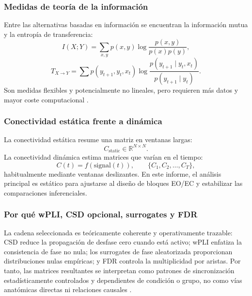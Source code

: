 \subsubsection{Medidas de teoría de la información}

Entre las alternativas basadas en información se encuentran la información mutua y la entropía de transferencia:
\[
I(X;Y)=\sum_{x,y}p(x,y)\log\frac{p(x,y)}{p(x)p(y)},
\]
\[
T_{X\to Y}=\sum p(y_{t+1},y_t,x_t)\log\frac{p(y_{t+1}\mid y_t,x_t)}{p(y_{t+1}\mid y_t)}.
\]
Son medidas flexibles y potencialmente no lineales, pero requieren más datos y mayor coste computacional \citep{Blinowska-Cieslak2022,Cohen2014}.

\subsubsection{Conectividad estática frente a dinámica}

La conectividad estática resume una matriz en ventanas largas:
\[
C_{\text{static}} \in \mathbb{R}^{N\times N}.
\]
La conectividad dinámica estima matrices que varían en el tiempo:
\[
C(t)=f(\text{signal}(t)),\qquad \{C_1,C_2,\dots,C_T\},
\]
habitualmente mediante ventanas deslizantes. En este informe, el análisis principal es estático para ajustarse al diseño de bloques EO/EC y estabilizar las comparaciones inferenciales.

\subsubsection{Por qué wPLI, CSD opcional, surrogates y FDR}

La cadena seleccionada es teóricamente coherente y operativamente trazable: CSD reduce la propagación de desfase cero cuando está activo; wPLI enfatiza la consistencia de fase no nula; los surrogates de fase aleatorizada proporcionan distribuciones nulas empíricas; y FDR controla la multiplicidad por aristas. Por tanto, las matrices resultantes se interpretan como patrones de sincronización estadísticamente controlados y dependientes de condición o grupo, no como vías anatómicas directas ni relaciones causales \citep{Cohen2014,Blinowska-Cieslak2022,Vinck2011WPLI,Friston2011Connectivity,Cao2022EEGConnectivity}.
